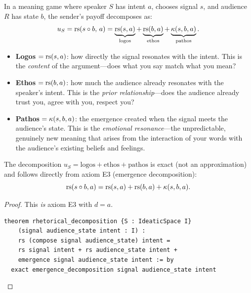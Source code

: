 \begin{definition}
\label{def:rhetorical-decomposition}
In a meaning game where speaker $S$ has intent $a$, chooses signal $s$, and
audience $R$ has state $b$, the sender's payoff decomposes as:
\[
  u_S = \mathrm{rs}(s \circ b,\, a) = \underbrace{\mathrm{rs}(s, a)}_{\text{logos}}
  + \underbrace{\mathrm{rs}(b, a)}_{\text{ethos}}
  + \underbrace{\kappa(s, b, a)}_{\text{pathos}}.
\]
\begin{itemize}
  \item \textbf{Logos} $= \mathrm{rs}(s, a)$: how directly the signal resonates with
        the intent.  This is the \emph{content} of the argument---does what you
        say match what you mean?
  \item \textbf{Ethos} $= \mathrm{rs}(b, a)$: how much the audience already resonates
        with the speaker's intent.  This is the \emph{prior relationship}---does
        the audience already trust you, agree with you, respect you?
  \item \textbf{Pathos} $= \kappa(s, b, a)$: the emergence created when the
        signal meets the audience's state.  This is the \emph{emotional
        resonance}---the unpredictable, genuinely new meaning that arises from
        the interaction of your words with the audience's existing beliefs and
        feelings.
\end{itemize}
\end{definition}

\begin{theorem}
\label{thm:lep-decomposition}
The decomposition $u_S = \text{logos} + \text{ethos} + \text{pathos}$ is
exact (not an approximation) and follows directly from axiom E3 (emergence
decomposition):
\[
  \mathrm{rs}(s \circ b, a) = \mathrm{rs}(s, a) + \mathrm{rs}(b, a) + \kappa(s, b, a).
\]
\end{theorem}

\begin{proof}
This \emph{is} axiom E3 with $d = a$.

\begin{lstlisting}[caption={Lean 4: Rhetorical decomposition is E3}]
theorem rhetorical_decomposition {S : IdeaticSpace I}
    (signal audience_state intent : I) :
    rs (compose signal audience_state) intent =
    rs signal intent + rs audience_state intent +
    emergence signal audience_state intent := by
  exact emergence_decomposition signal audience_state intent
\end{lstlisting}
\end{proof}


